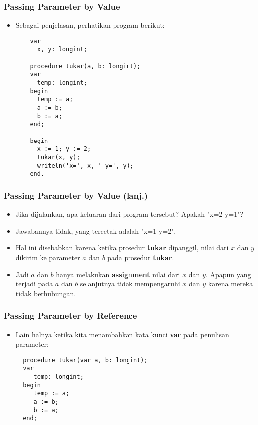 \begin{frame}[fragile]
\frametitle{Passing Parameter by Value}
\begin{itemize}
  \item Sebagai penjelasan, perhatikan program berikut:
  \begin{lstlisting}
    var
      x, y: longint;

    procedure tukar(a, b: longint);
    var
      temp: longint;
    begin
      temp := a;
      a := b;
      b := a;
    end;

    begin
      x := 1; y := 2;
      tukar(x, y);
      writeln('x=', x, ' y=', y);
    end.
  \end{lstlisting}
\end{itemize}
\end{frame}

\begin{frame}[fragile]
\frametitle{Passing Parameter by Value (lanj.)}
\begin{itemize}
  \item Jika dijalankan, apa keluaran dari program tersebut? Apakah "x=2 y=1"?
  \item Jawabannya \alert{tidak}, yang tercetak adalah "x=1 y=2".
  \item Hal ini disebabkan karena ketika prosedur \textbf{tukar} dipanggil, \alert{nilai} dari $x$ dan $y$ dikirim ke parameter $a$ dan $b$ pada prosedur \textbf{tukar}.
  \item Jadi $a$ dan $b$ hanya melakukan \textbf{assignment} nilai dari $x$ dan $y$. Apapun yang terjadi pada $a$ dan $b$ selanjutnya tidak mempengaruhi $x$ dan $y$ karena mereka \alert{tidak berhubungan}.
\end{itemize}
\end{frame}

\begin{frame}[fragile]
\frametitle{Passing Parameter by Reference}
\begin{itemize}
  \item Lain halnya ketika kita menambahkan kata kunci \textbf{var} pada penulisan parameter:
  \begin{lstlisting}
  procedure tukar(var a, b: longint);
  var
     temp: longint;
  begin
     temp := a;
     a := b;
     b := a;
  end;
  \end{lstlisting}
\end{itemize}
\end{frame}

